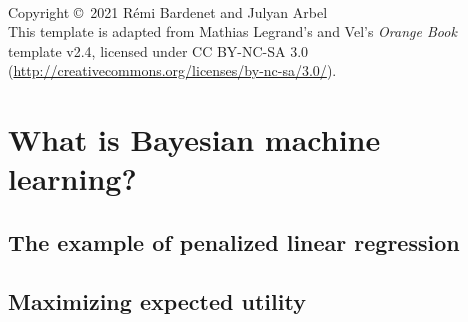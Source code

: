 \documentclass[11pt,fleqn]{book} %
\begin{document}



\newpage
~\vfill
\thispagestyle{empty}

\noindent Copyright \copyright\ 2021 Rémi Bardenet and Julyan Arbel\\ %


\noindent This template is adapted from Mathias Legrand's and Vel's
 \emph{Orange Book} template v2.4, licensed under CC BY-NC-SA 3.0
 (\url{http://creativecommons.org/licenses/by-nc-sa/3.0/}).



\pagestyle{empty} %
\tableofcontents %
\cleardoublepage %
\pagestyle{fancy} %

\part{What is Bayesian machine learning?}
    \chapter{The example of penalized linear regression}
    \label{ch:penalized_linear_regression}
    
 
    \chapter{Maximizing expected utility}
    \label{ch:expected_utility}
    
\end{document}
